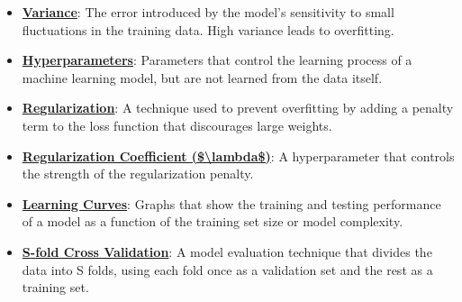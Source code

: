 \documentclass{article}%
\begin{document}
\begin{itemize}[leftmargin=*]
\item \href{https://purdue.brightspace.com/d2l/common/assets/pdfjs-d2l-dist/1.0.14-legacy/web/viewer.html?file=%2Fcontent%2Fenforced%2F1095467-wl.202510.CS.24300.001%2F10L1-CrossValidation.pdf%3Fou%3D1095467&lang=en-us&container=d2l-fileviewer-rendered-pdf&fullscreen=d2l-fileviewer-rendered-pdf-dialog&height=667#page=4}{\textbf{Variance}}: The error introduced by the model's sensitivity to small fluctuations in the training data. High variance leads to overfitting.%
\item \href{https://purdue.brightspace.com/d2l/common/assets/pdfjs-d2l-dist/1.0.14-legacy/web/viewer.html?file=%2Fcontent%2Fenforced%2F1095467-wl.202510.CS.24300.001%2F10L1-CrossValidation.pdf%3Fou%3D1095467&lang=en-us&container=d2l-fileviewer-rendered-pdf&fullscreen=d2l-fileviewer-rendered-pdf-dialog&height=667#page=10}{\textbf{Hyperparameters}}: Parameters that control the learning process of a machine learning model, but are not learned from the data itself.%
\item \href{https://purdue.brightspace.com/d2l/common/assets/pdfjs-d2l-dist/1.0.14-legacy/web/viewer.html?file=%2Fcontent%2Fenforced%2F1095467-wl.202510.CS.24300.001%2F10L1-CrossValidation.pdf%3Fou%3D1095467&lang=en-us&container=d2l-fileviewer-rendered-pdf&fullscreen=d2l-fileviewer-rendered-pdf-dialog&height=667#page=17}{\textbf{Regularization}}: A technique used to prevent overfitting by adding a penalty term to the loss function that discourages large weights.%
\item \href{https://purdue.brightspace.com/d2l/common/assets/pdfjs-d2l-dist/1.0.14-legacy/web/viewer.html?file=%2Fcontent%2Fenforced%2F1095467-wl.202510.CS.24300.001%2F10L1-CrossValidation.pdf%3Fou%3D1095467&lang=en-us&container=d2l-fileviewer-rendered-pdf&fullscreen=d2l-fileviewer-rendered-pdf-dialog&height=667#page=17}{\textbf{Regularization Coefficient (\$\textbackslash{}lambda\$)}}: A hyperparameter that controls the strength of the regularization penalty.%
\item \href{https://purdue.brightspace.com/d2l/common/assets/pdfjs-d2l-dist/1.0.14-legacy/web/viewer.html?file=%2Fcontent%2Fenforced%2F1095467-wl.202510.CS.24300.001%2F10L1-CrossValidation.pdf%3Fou%3D1095467&lang=en-us&container=d2l-fileviewer-rendered-pdf&fullscreen=d2l-fileviewer-rendered-pdf-dialog&height=667#page=20}{\textbf{Learning Curves}}: Graphs that show the training and testing performance of a model as a function of the training set size or model complexity.%
\item \href{https://purdue.brightspace.com/d2l/common/assets/pdfjs-d2l-dist/1.0.14-legacy/web/viewer.html?file=%2Fcontent%2Fenforced%2F1095467-wl.202510.CS.24300.001%2F10L1-CrossValidation.pdf%3Fou%3D1095467&lang=en-us&container=d2l-fileviewer-rendered-pdf&fullscreen=d2l-fileviewer-rendered-pdf-dialog&height=667#page=25}{\textbf{S{-}fold Cross Validation}}: A model evaluation technique that divides the data into S folds, using each fold once as a validation set and the rest as a training set.%

\end{itemize}
\end{document}
